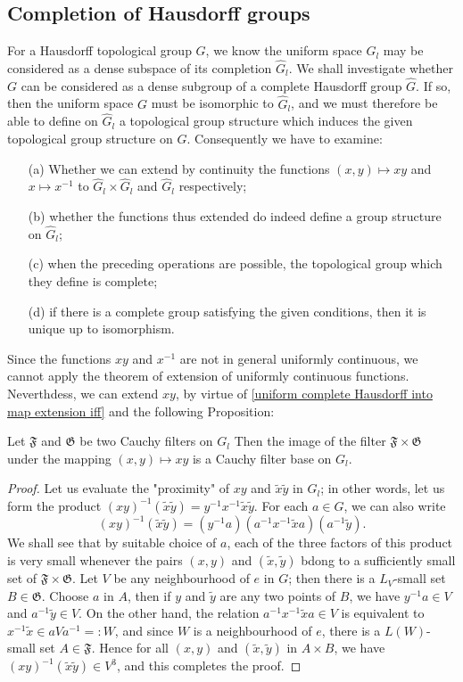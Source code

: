\subsection{Completion of Hausdorff groups}
For a Hausdorff topological group $G$, we know the uniform space $G_l$ may be considered as a dense subspace of its completion $\widehat{G}_l$. We shall investigate whether $G$ can be considered as a dense subgroup of a complete Hausdorff group $\widehat{G}$. If so, then the uniform space $G$ must be isomorphic to $\widehat{G}_l$, and we must therefore be able to define on $\widehat{G}_l$ a topological group structure which induces the given topological group structure on $G$. Consequently we have to examine:
\begin{itemize}
\item[(a)] Whether we can extend by continuity the functions $(x,y)\mapsto xy$ and $x\mapsto x^{-1}$ to $\widehat{G}_l\times\widehat{G}_l$ and $\widehat{G}_l$ respectively;
\item[(b)] whether the functions thus extended do indeed define a group structure on $\widehat{G}_l$;
\item[(c)] when the preceding operations are possible, the topological group which they define is complete;
\item[(d)] if there is a complete group satisfying the given conditions, then it is unique up to isomorphism.
\end{itemize}
Since the functions $xy$ and $x^{-1}$ are not in general uniformly continuous, we cannot apply the theorem of extension of uniformly continuous functions. Neverthdess, we can extend $xy$, by virtue of \cref{uniform complete Hausdorff into map extension iff} and the following Proposition:
\begin{proposition}\label{topological group Cauchy filter under multiplication}
Let $\mathfrak{F}$ and $\mathfrak{G}$ be two Cauchy filters on $G_l$ Then the image of the filter $\mathfrak{F}\times\mathfrak{G}$ under the mapping $(x,y)\mapsto xy$ is a Cauchy filter base on $G_l$.
\end{proposition}
\begin{proof}
Let us evaluate the "proximity" of $xy$ and $\tilde{x}\tilde{y}$ in $G_l$; in other words, let us form the product $(xy)^{-1}(\tilde{x}\tilde{y})=y^{-1}x^{-1}\tilde{x}\tilde{y}$. For each $a\in G$, we can also write
\[(xy)^{-1}(\tilde{x}\tilde{y})=(y^{-1}a)(a^{-1}x^{-1}\tilde{x}a)(a^{-1}\tilde{y}).\]
We shall see that by suitable choice of $a$, each of the three factors of this product is very small whenever the pairs $(x,y)$ and $(\tilde{x},\tilde{y})$ bdong to a sufficiently small set of $\mathfrak{F}\times\mathfrak{G}$. Let $V$ be any neighbourhood of $e$ in $G$; then there is a $L_V$-small set $B\in\mathfrak{G}$. Choose $a$ in $A$, then if $y$ and $\tilde{y}$ are any two points of $B$, we have $y^{-1}a\in V$ and $a^{-1}\tilde{y}\in V$. On the other hand, the relation $a^{-1}x^{-1}\tilde{x}a\in V$ is equivalent to $x^{-1}\tilde{x}\in aVa^{-1}=:W$, and since $W$ is a neighbourhood of $e$, there is a $L(W)$-small set $A\in\mathfrak{F}$. Hence for all $(x,y)$ and $(\tilde{x},\tilde{y})$ in $A\times B$, we have $(xy)^{-1}(\tilde{x}\tilde{y})\in V^3$, and this completes the proof.
\end{proof}
